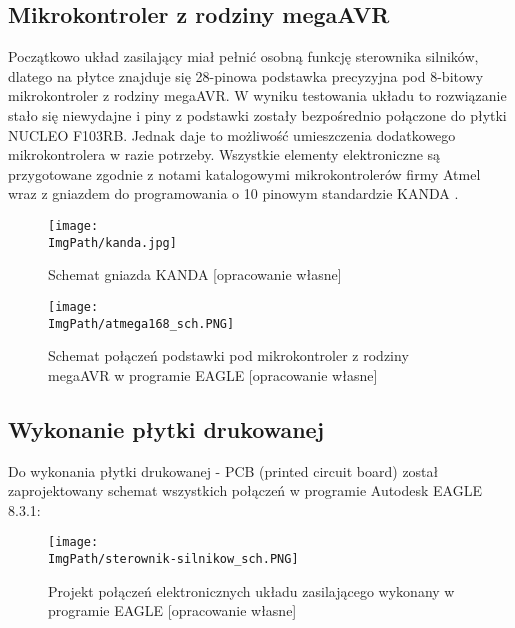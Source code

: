 \documentclass[a4paper,12pt,twoside,openany]{report}
\newcommand{\ImgPath}{.}
\begin{document}
\subsection{Mikrokontroler z rodziny megaAVR}

Początkowo układ zasilający miał pełnić osobną funkcję sterownika silników, dlatego na płytce znajduje się 28-pinowa podstawka precyzyjna pod 8-bitowy mikrokontroler z rodziny megaAVR. W wyniku testowania układu to rozwiązanie stało się niewydajne i piny z podstawki zostały bezpośrednio połączone do płytki NUCLEO F103RB. Jednak daje to możliwość umieszczenia dodatkowego mikrokontrolera w razie potrzeby. Wszystkie elementy elektroniczne są przygotowane zgodnie z notami katalogowymi mikrokontrolerów firmy Atmel wraz z gniazdem do programowania o 10 pinowym standardzie KANDA \cite{atmega168}.

\begin{figure}[!htbp]
	\begin{center}
\centering
\texttt{[image: \\ImgPath/kanda.jpg]}
\end{center}
	\caption{Schemat gniazda KANDA [opracowanie własne]}
	\label{schematKomunikacji}
\end{figure}

\begin{figure}[!htbp]
	\begin{center}
\centering
\texttt{[image: \\ImgPath/atmega168\_sch.PNG]}
\end{center}
	\caption{Schemat połączeń podstawki pod mikrokontroler z rodziny megaAVR w programie EAGLE [opracowanie własne]}
	\label{schematKomunikacji}
\end{figure}

\newpage
\subsection{Wykonanie płytki drukowanej}

Do wykonania płytki drukowanej - PCB (printed circuit board) został zaprojektowany schemat wszystkich połączeń w programie Autodesk EAGLE 8.3.1:

\begin{figure}[!htbp]
	\begin{center}
\centering
\texttt{[image: \\ImgPath/sterownik-silnikow\_sch.PNG]}
\end{center}
	\caption{Projekt połączeń elektronicznych układu zasilającego wykonany w programie EAGLE [opracowanie własne]}
	\label{schematKomunikacji}
\end{figure}
\end{document}
